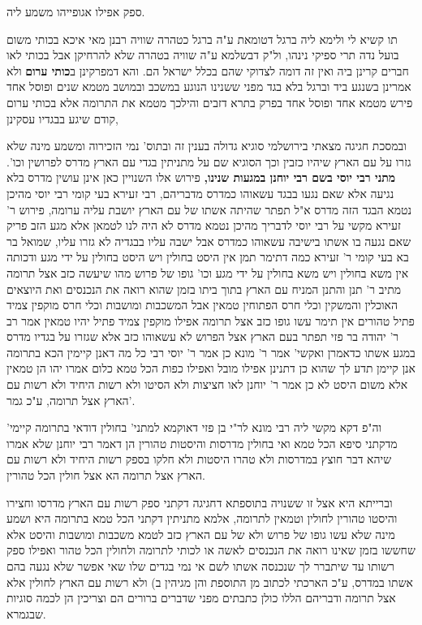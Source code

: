 \documentclass[12pt, openany]{book}
\begin{document}
{ספק אפילו אגופייהו משמע ליה.\par תו קשיא לי ולימא ליה ברגל דטומאת ע"ה ברגל כטהרה שוויה רבנן מאי איכא בכותי משום בועל נדה תרי ספיקי נינהו, ול"ק דבשלמא ע"ה שוויה בטהרה שלא להרחיקן אבל בכותי לאו חברים קרינן ביה ואין זה דומה לצדוקי שהם בכלל ישראל הם. 
והא דמפרקינן ב\textbf{כותי ערום} ולא אמרינן בשנגע ביד וברגל בלא בגד מפני ששנינו הנוגע במשכב ובמושב מטמא שנים ופוסל אחד פירש מטמא אחד ופוסל אחד בפרק בתרא דזבים והילכך מטמא את התרומה אלא בכותי ערום קודם שיגע בבגדיו עסקינן,\par ובמסכת חגיגה מצאתי בירושלמי סוגיא גדולה בענין זה ובתוס' נמי הזכירוה ומשמע מינה שלא גזרו על עם הארץ שיהיו כזבין וכך הסוגיא שם על מתניתין בגדי עם הארץ מדרס לפרושין וכו'. 
\textbf{מתני רבי יוסי בשם רבי יוחנן במגעות שנינו,} פירוש אלו השנויין כאן אינן עושין מדרס בלא נגיעה אלא שאם נגעו בבגד עשאוהו כמדרס מדבריהם, רבי זעירא בעי קומי רבי יוסי מהיכן נטמא הבגד הזה מדרס א"ל תפתר שהיתה אשתו של עם הארץ יושבת עליה ערומה, פירוש ר' זעירא מקשי על רבי יוסי לדבריך מהיכן נטמא מדרס לא היה לנו לטמאן אלא מגע הזב פריק שאם נגעה בו אשתו בישיבה עשאוהו כמדרס אבל ישבה עליו בבגדיה לא גזרו עליו, שמואל בר בא בעי קומי ר' זעירא כמה דתימר תמן אין היסט בחולין ויש היסט בחולין על ידי מגע ודכותה אין משא בחולין ויש משא בחולין על ידי מגע וכו' גופו של פרוש מהו שיעשה כזב אצל תרומה מתיב ר' תנן והתנן המניח עם הארץ בתוך ביתו בזמן שהוא רואה את הנכנסים ואת היוצאים האוכלין והמשקין וכלי חרס הפתוחין טמאין אבל המשכבות ומושבות וכלי חרס מוקפין צמיד פתיל טהורים אין תימר עשו גופו כזב אצל תרומה אפילו מוקפין צמיד פתיל יהיו טמאין אמר רב ר' יהודה בר פזי תפתר בעם הארץ אצל הפרוש לא עשאוהו כזב אלא שגזרו על בגדיו מדרס במגע אשתו כדאמרן ואקשי' אמר ר' מונא כן אמר ר' יוסי רבי כל מה דאנן קיימין הכא בתרומה אנן קיימן תדע לך שהוא כן דתנינן אפילו מובל ואפילו כפות הכל טמא כלום אמרו יהו הן טמאין אלא משום היסט לא כן אמר ר' יוחנן לאו חציצות ולא הסיטו ולא רשות היחיד ולא רשות עם הארץ אצל תרומה, ע"כ גמר'.\par וה"פ דקא מקשי ליה רבי מונא לר"י בן פזי דאוקמא למתני' בחולין דודאי בתרומה קיימי' מדקתני סיפא הכל טמא ואי בחולין מדרסות והיסטות טהורין הן דאמר רבי יוחנן שלא אמרו שיהא דבר חוצץ במדרסות ולא טהרו היסטות ולא חלקו בספק רשות היחיד ולא רשות עם הארץ אצל תרומה הא אצל חולין הכל טהורין.\par וברייתא היא אצל זו ששנויה בתוספתא דחגיגה דקתני ספק רשות עם הארץ מדרסו וחצירו והיסטו טהורין לחולין וטמאין לתרומה, אלמא מתניתין דקתני הכל טמא בתרומה היא ושמע מינה שלא עשו גופו של פרוש ולא של עם הארץ כזב לטמא משכבות ומושבות והיסט אלא שחששו בזמן שאינו רואה את הנכנסים לאשה או לכותי לתרומה ולחולין הכל טהור ואפילו ספק רשותו עד שיתברר לך שנכנסה אשתו לשם אי נמי בגדים שלו שאי אפשר שלא נגעה בהם אשתו במדרס, ע"כ הארכתי לכתוב מן התוספת והן מגיהין ב) ולא רשות עם הארץ לחולין אלא אצל תרומה ודבריהם הללו כולן כתבתים מפני שדברים ברורים הם וצריכין הן לכמה סוגיות שבגמרא. 
}
\end{document}
